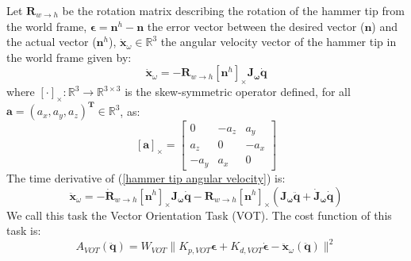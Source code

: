 \documentclass[conference]{IEEEtran}
\begin{document}
Let $\mathbf{R}_{w \to h}$ be the rotation matrix describing the rotation of the hammer tip from the world frame, $\bm \epsilon = \mathbf{n}^h - \mathbf{n}$ the error vector between the desired vector ($\mathbf{n}$) and the actual vector ($\mathbf{n}^h$), $\mathbf{\dot x}_{\omega} \in \mathbb{R}^{3}$ the angular velocity vector of the hammer tip in the world frame given by:
\begin{equation}
    \mathbf{\dot x}_{\omega} = -\mathbf{R}_{w \to h}  \left[\mathbf{n}^h \right]_{\times} \mathbf{J_\omega \dot q}
\label{hammer tip angular velocity}
\end{equation}
where $\left[ \cdot \right]_{\times}: \mathbb{R}^3 \to \mathbb{R}^{3 \times 3}$ is the skew-symmetric operator defined, for all $\mathbf{a} =(a_x, a_y, a_z)^\mathbf{T} \in \mathbb{R}^3$, as:
\begin{equation}
\left[ \mathbf{a} \right]_{\times} = 
\begin{bmatrix}
    0 & - a_z & a_y \\
    a_z & 0 & -a_x \\
    -a_y &  a_x & 0
\end{bmatrix}
\end{equation}
The time derivative of (\ref{hammer tip angular velocity}) is:
{\small
\begin{equation}
    \mathbf{\ddot x}_{\omega} = -\mathbf{\dot R}_{w \to h}\left[\mathbf{n}^h \right]_{\times} \mathbf{J_\omega \dot q} - \mathbf{R}_{w \to h}\left[\mathbf{n}^h \right]_{\times}\left( \mathbf{J_{\omega} \ddot q + \dot J_{\omega} \dot q} \right)
\end{equation}
}
\noindent
We call this task the Vector Orientation Task (VOT).
The cost function of this task is:
\begin{equation}
     A_{VOT}(\mathbf{\ddot q}) = W_{VOT}\| K_{p, VOT} \bm \epsilon + K_{d,VOT} \bm {\dot \epsilon}- \mathbf{\ddot x}_{\omega}(\mathbf{\ddot q}) \|^2 
\end{equation}
\end{document}
